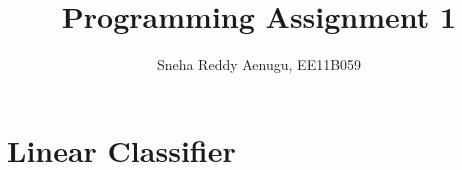 \documentclass[12pt]{article}
\begin{document}
 
 
 
\title{Programming Assignment 1}%
\author{Sneha Reddy Aenugu, EE11B059\\ %
} %
 
\maketitle

\section{Linear Classifier}
 
\end{document}
